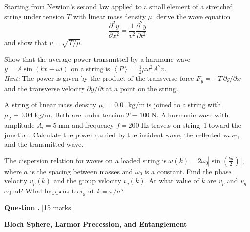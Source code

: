 \documentclass[12pt,a4paper]{article}
\newcounter{questioncounter}
\newcommand{\question}[1]{%
  \stepcounter{questioncounter}%
  \vspace{0.5cm}%
  \noindent\textbf{Question \thequestioncounter.} \hfill [#1 marks]%
  \vspace{0.2cm}%
  \par%
}
\renewcommand{\expect}[1]{\left\langle #1\right\rangle}
\begin{document}
\begin{parts}
\item Starting from Newton's second law applied to a small element of a stretched string under tension $T$ with linear mass density $\mu$, derive the wave equation
\[
\frac{\partial^2 y}{\partial x^2} = \frac{1}{v^2}\frac{\partial^2 y}{\partial t^2}
\]
and show that $v = \sqrt{T/\mu}$. 

\item Show that the average power transmitted by a harmonic wave $y = A\sin(kx - \omega t)$ on a string is $\expect{P} = \tfrac{1}{2}\mu\omega^2 A^2 v$. \\
\textit{Hint:} The power is given by the product of the transverse force $F_y = -T\,\partial y/\partial x$ and the transverse velocity $\partial y/\partial t$ at a point on the string. 

\item A string of linear mass density $\mu_1 = 0.01\;\text{kg/m}$ is joined to a string with $\mu_2 = 0.04\;\text{kg/m}$. Both are under tension $T = 100\;\text{N}$. A harmonic wave with amplitude $A_i = 5\;\text{mm}$ and frequency $f = 200\;\text{Hz}$ travels on string~1 toward the junction. Calculate the power carried by the incident wave, the reflected wave, and the transmitted wave. 

\item The dispersion relation for waves on a loaded string is $\omega(k) = 2\omega_0\left|\sin\!\left(\frac{ka}{2}\right)\right|$, where $a$ is the spacing between masses and $\omega_0$ is a constant. Find the phase velocity $v_p(k)$ and the group velocity $v_g(k)$. At what value of $k$ are $v_p$ and $v_g$ equal? What happens to $v_g$ at $k = \pi/a$? 
\end{parts}

\newpage

\question{15}

\noindent\textbf{Bloch Sphere, Larmor Precession, and Entanglement}
\end{document}
